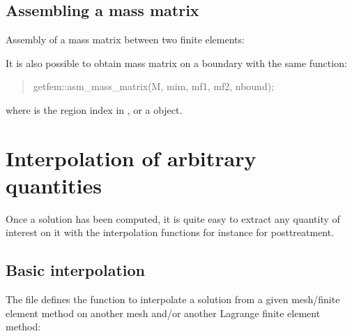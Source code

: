 \documentclass[a4paper,11pt,english]{sphinxmanual}
\begin{document}
\begin{sphinxVerbatim}[commandchars=\\\{\}]
    
                          
\end{sphinxVerbatim}


\section{Assembling a mass matrix}
\label{\detokenize{userdoc/asm:assembling-a-mass-matrix}}
Assembly of a mass matrix between two finite elements:

\begin{sphinxVerbatim}[commandchars=\\\{\}]
   
\end{sphinxVerbatim}

It is also possible to obtain mass matrix on a boundary with the same function:
\begin{quote}

getfem::asm\_mass\_matrix(M, mim, mf1, mf2, nbound);
\end{quote}

where  is the region index in , or a
 object.


\chapter{Interpolation of arbitrary quantities}
\label{\detokenize{userdoc/interMM:interpolation-of-arbitrary-quantities}}\label{\detokenize{userdoc/interMM:ud-intermm}}\label{\detokenize{userdoc/interMM::doc}}
Once a solution has been computed, it is quite easy to extract any quantity of interest on it with the interpolation functions for instance for post\sphinxhyphen{}treatment.


\section{Basic interpolation}
\label{\detokenize{userdoc/interMM:basic-interpolation}}
The file  defines the function
 to interpolate a solution from a given mesh/finite
element method on another mesh and/or another Lagrange finite element method:
\end{document}
